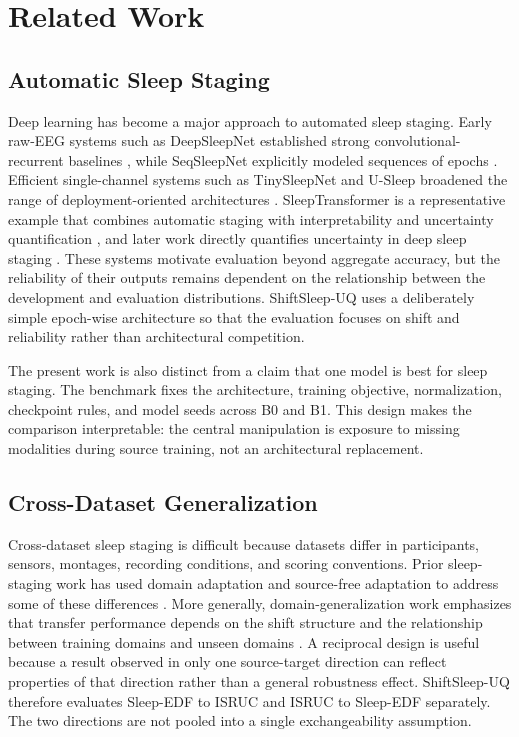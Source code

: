 \documentclass[10pt,twocolumn]{article}
\begin{document}
\section{Related Work}
\subsection{Automatic Sleep Staging}
Deep learning has become a major approach to automated sleep staging. Early raw-EEG systems such as DeepSleepNet established strong convolutional-recurrent baselines \citep{supratak2017deepsleepnet}, while SeqSleepNet explicitly modeled sequences of epochs \citep{phan2019seqsleepnet}. Efficient single-channel systems such as TinySleepNet and U-Sleep broadened the range of deployment-oriented architectures \citep{supratak2020tinysleepnet,perslev2021usleep}. SleepTransformer is a representative example that combines automatic staging with interpretability and uncertainty quantification \citep{phan2022sleeptransformer}, and later work directly quantifies uncertainty in deep sleep staging \citep{vainikka2026directuq}. These systems motivate evaluation beyond aggregate accuracy, but the reliability of their outputs remains dependent on the relationship between the development and evaluation distributions. ShiftSleep-UQ uses a deliberately simple epoch-wise architecture so that the evaluation focuses on shift and reliability rather than architectural competition.

The present work is also distinct from a claim that one model is best for sleep staging. The benchmark fixes the architecture, training objective, normalization, checkpoint rules, and model seeds across B0 and B1. This design makes the comparison interpretable: the central manipulation is exposure to missing modalities during source training, not an architectural replacement.

\subsection{Cross-Dataset Generalization}
Cross-dataset sleep staging is difficult because datasets differ in participants, sensors, montages, recording conditions, and scoring conventions. Prior sleep-staging work has used domain adaptation and source-free adaptation to address some of these differences \citep{zhao2021unsupervisedsleepdomain,zhou2025sourcefree,zhu2023multisource}. More generally, domain-generalization work emphasizes that transfer performance depends on the shift structure and the relationship between training domains and unseen domains \citep{zhou2022dgsurvey}. A reciprocal design is useful because a result observed in only one source-target direction can reflect properties of that direction rather than a general robustness effect. ShiftSleep-UQ therefore evaluates Sleep-EDF to ISRUC and ISRUC to Sleep-EDF separately. The two directions are not pooled into a single exchangeability assumption.
\end{document}
